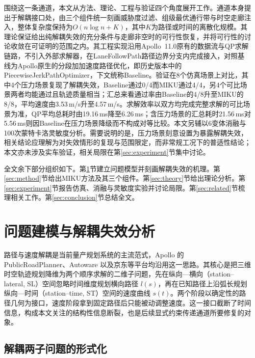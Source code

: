 \documentclass[a4paper,11pt]{ctexart}
\theoremstyle{definition}
\begin{document}
围绕这一条通道，本文从方法、理论、工程与验证四个角度展开工作。通道本身提出于解耦接口处，由三个组件统一刻画威胁度过滤、组级最优通行带与时空走廊注入，整体复杂度保持为$O(n\log n + K)$，其中$K$为路径或时间的离散化规模。其理论保证给出纯解耦失效的充分条件与走廊非空时的可行性恢复，并将可行性的讨论收敛在可证明的范围之内。其工程实现沿用Apollo~11.0原有的数据流与QP求解链路，不引入外部求解器，在LaneFollowPath路径边界分支内完成接入，对照基线为Apollo原生的分段加加速度路径优化，即历史版本中的PiecewiseJerkPathOptimizer，下文统称Baseline。验证在8个仿真场景上对比，其中4个压力场景复现了解耦失效，Baseline通过0/4而MIKU通过4/4，另4个可比场景两者均能通过且轨迹质量相当；汇总来看通过率由Baseline的4/8升至MIKU的8/8，平均速度由3.53\,m/s升至4.57\,m/s。求解效率以双方均完成完整求解的可比场景为准，QP平均总耗时由19.16\,ms降至6.26\,ms；含压力场景的汇总耗时21.56\,ms对5.56\,ms则因Baseline在压力场景降级而不构成对等比较。本文另辅以6变体消融与100次蒙特卡洛灵敏度分析。需要说明的是，压力场景刻意设置为暴露解耦失效，相关结论应理解为对失效情形的复现与范围限定，而非常规工况下的普适性结论；本文亦未涉及实车验证，相关局限在第\ref{sec:experiment}节集中讨论。

全文余下部分组织如下。第\ref{sec:problem}节建立问题模型并刻画解耦失效的机理。第\ref{sec:method}节给出MIKU方法及其三个组件。第\ref{sec:theory}节给出理论分析。第\ref{sec:experiment}节报告仿真、消融与灵敏度实验并讨论局限。第\ref{sec:related}节梳理相关工作。第\ref{sec:conclusion}节总结全文。

\section{问题建模与解耦失效分析}
\label{sec:problem}

路径与速度解耦是当前量产规划系统的主流范式，Apollo 的 PublicRoadPlanner、Autoware 以及京东等平台均沿用这一思路。其核心是把三维时空轨迹规划降维为两个顺序求解的二维子问题，先在纵向—横向（station--lateral, SL）空间忽略时间维度规划横向路径 $l(s)$，再在已知路径上沿弧长规划纵向—时间（station--time, ST）空间的速度曲线 $s(t)$。两个阶段以确定性的路径几何为接口，速度阶段拿到固定路径后只能被动调整速度。这一接口截断了时间信息，构成本文关注的结构性信息断裂，也是后续显式约束传递通道所要修复的对象。

\subsection{解耦两子问题的形式化}
\label{subsec:decouple_formalize}
\end{document}

